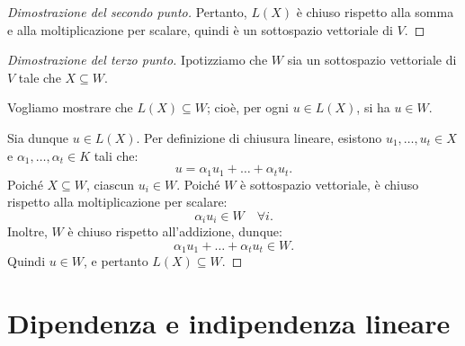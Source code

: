 {\begin{proof}[Dimostrazione del secondo punto]
        Pertanto, \( L(X) \) è chiuso rispetto alla somma e alla moltiplicazione per scalare, quindi è un sottospazio vettoriale di \( V \).
    \end{proof}

    \begin{proof}[Dimostrazione del terzo punto]
        Ipotizziamo che \( W \) sia un sottospazio vettoriale di \( V \) tale che \( X \subseteq W \).

        Vogliamo mostrare che \( L(X) \subseteq W \); cioè, per ogni \( u \in L(X) \), si ha \( u \in W \).

        Sia dunque \( u \in L(X) \). Per definizione di chiusura lineare, esistono \( u_1, \dots, u_t \in X \) e \( \alpha_1, \dots, \alpha_t \in K \) tali che:
        \[
        u = \alpha_1 u_1 + \dots + \alpha_t u_t.
        \]
        Poiché \( X \subseteq W \), ciascun \( u_i \in W \).  
        Poiché \( W \) è sottospazio vettoriale, è chiuso rispetto alla moltiplicazione per scalare:
        \[
        \alpha_i u_i \in W \quad \forall i.
        \]
        Inoltre, \( W \) è chiuso rispetto all’addizione, dunque:
        \[
        \alpha_1 u_1 + \dots + \alpha_t u_t \in W.
        \]
        Quindi \( u \in W \), e pertanto \( L(X) \subseteq W \).
    \end{proof}
}

\section{Dipendenza e indipendenza lineare}


